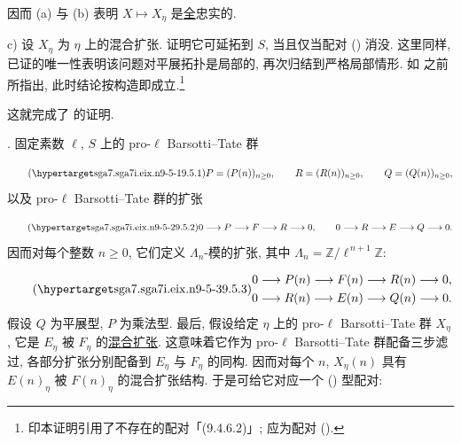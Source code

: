 因而 (a) 与 (b) 表明 $X\longmapsto X_\eta$ 是\underline{全}忠实的.

\smallskip
\noindent
c) 设 $X_\eta$ 为 $\eta$ 上的混合扩张. 证明它可延拓到 $S$, 当且仅当配对 () 消没. 这里同样, 已证的唯一性表明该问题对平展拓扑是局部的, 再次归结到严格局部情形. 如  之前所指出, 此时结论按构造即成立.\footnote{印本证明引用了不存在的配对「(9.4.6.2)」; 应为配对 ().}

这就完成了  的证明.



\medskip
\noindent
{}. 固定素数 $\ell$, $S$ 上的 pro-$\ell$ Barsotti--Tate 群

\begin{equation}\tag{\SGARefTarget{sga7.sga7i.eix.n9-5-1}{9.5.1}}
P=(P(n))_{n\geq0},
\qquad R=(R(n))_{n\geq0},
\qquad Q=(Q(n))_{n\geq0},
\end{equation}
以及 pro-$\ell$ Barsotti--Tate 群的扩张

\begin{equation}\tag{\SGARefTarget{sga7.sga7i.eix.n9-5-2}{9.5.2}}
0\longrightarrow P\longrightarrow F\longrightarrow R\longrightarrow0,
\qquad
0\longrightarrow R\longrightarrow E\longrightarrow Q\longrightarrow0.
\end{equation}
因而对每个整数 $n\geq0$, 它们定义 $\Lambda_n$-模的扩张, 其中 $\Lambda_n=\mathbb Z/\ell^{\,n+1}\mathbb Z$:

\begin{equation}\tag{\SGARefTarget{sga7.sga7i.eix.n9-5-3}{9.5.3}}
\begin{gathered}
0\longrightarrow P(n)\longrightarrow F(n)\longrightarrow R(n)
 \longrightarrow0,\\
0\longrightarrow R(n)\longrightarrow E(n)\longrightarrow Q(n)
 \longrightarrow0.
\end{gathered}
\end{equation}
假设 $Q$ 为平展型, $P$ 为乘法型. 最后, 假设给定 $\eta$ 上的 pro-$\ell$ Barsotti--Tate 群 $X_\eta$, 它是 $E_\eta$ 被 $F_\eta$ 的\underline{混合扩张}. 这意味着它作为 pro-$\ell$ Barsotti--Tate 群配备三步滤过, 各部分扩张分别配备到 $E_\eta$ 与 $F_\eta$ 的同构. 因而对每个 $n$, $X_\eta(n)$ 具有 $E(n)_\eta$ 被 $F(n)_\eta$ 的混合扩张结构. 于是可给它对应一个 () 型配对:


